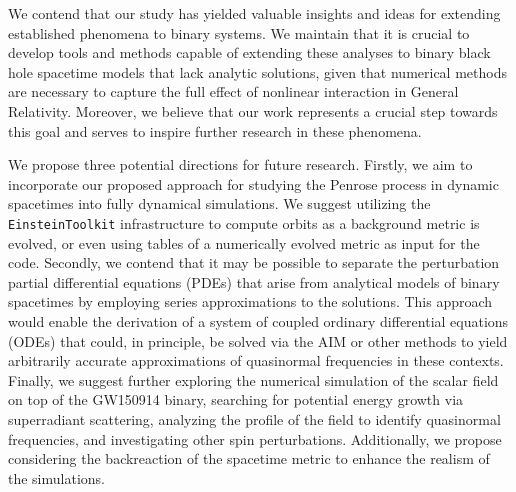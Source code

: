 We contend that our study has yielded valuable insights and ideas for extending established phenomena to binary systems. We maintain that it is crucial to develop tools and methods capable of extending these analyses to binary black hole spacetime models that lack analytic solutions, given that numerical methods are necessary to capture the full effect of nonlinear interaction in General Relativity. Moreover, we believe that our work represents a crucial step towards this goal and serves to inspire further research in these phenomena.

We propose three potential directions for future research. Firstly, we aim to incorporate our proposed approach for studying the Penrose process in dynamic spacetimes into fully dynamical simulations. We suggest utilizing the \texttt{EinsteinToolkit} infrastructure to compute orbits as a background metric is evolved, or even using tables of a numerically evolved metric as input for the code. Secondly, we contend that it may be possible to separate the perturbation partial differential equations (PDEs) that arise from analytical models of binary spacetimes by employing series approximations to the solutions. This approach would enable the derivation of a system of coupled ordinary differential equations (ODEs) that could, in principle, be solved via the AIM or other methods to yield arbitrarily accurate approximations of quasinormal frequencies in these contexts. Finally, we suggest further exploring the numerical simulation of the scalar field on top of the GW150914 binary, searching for potential energy growth via superradiant scattering, analyzing the profile of the field to identify quasinormal frequencies, and investigating other spin perturbations. Additionally, we propose considering the backreaction of the spacetime metric to enhance the realism of the simulations.